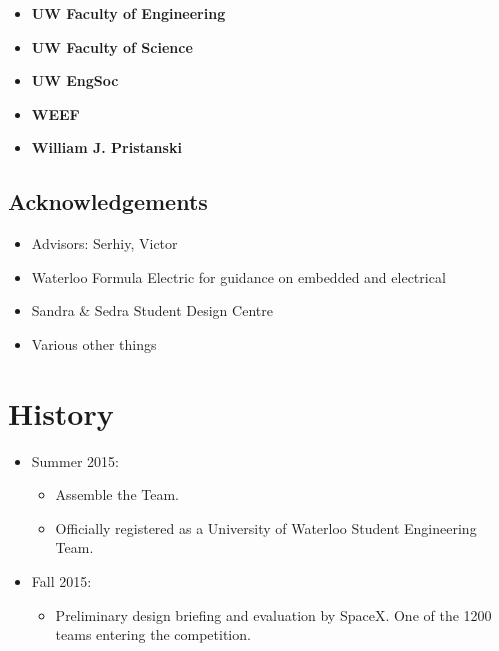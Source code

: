 \documentclass[main.tex]{subfiles}
\begin{document}
\begin{flushleft}
\begin{multicols}{3}
\begin{itemize}[label={},noitemsep]
    \item \textbf{UW Faculty of Engineering}
    \item \textbf{UW Faculty of Science}
    \item \textbf{UW EngSoc}
    \end{itemize}
\end{multicols}

\begin{multicols}{2}
\begin{itemize}[label={},noitemsep]
    \item \textbf{WEEF}
    \item \textbf{William J. Pristanski}
    \end{itemize}
\end{multicols}

\subsection{Acknowledgements}

\begin{itemize}
    \item Advisors: Serhiy, Victor
    \item Waterloo Formula Electric for guidance on embedded and electrical
    \item Sandra \& Sedra Student Design Centre
    \item Various other things
\end{itemize}
\section{History}
\begin{itemize}

\item Summer 2015:
\begin{itemize}
    \item Assemble the Team.
    \item Officially registered as a University of Waterloo Student Engineering Team.
\end{itemize}

\item Fall 2015:
\begin{itemize}
    \item Preliminary design briefing and evaluation by SpaceX. One of the 1200 teams entering the competition.
\end{itemize}


\end{itemize}
\end{flushleft}
\end{document}
